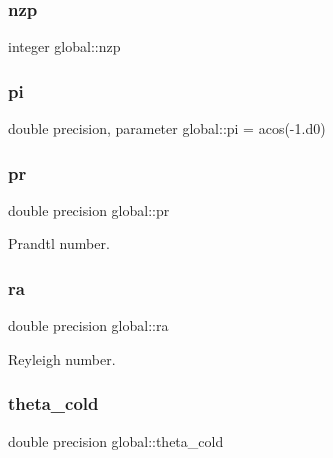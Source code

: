 \subsubsection{\texorpdfstring{nzp}{nzp}}
{\footnotesize\ttfamily integer global\+::nzp}

\mbox{\label{namespaceglobal_a2eeeef6cb4401e0205ced808c718dead}} 
\subsubsection{\texorpdfstring{pi}{pi}}
{\footnotesize\ttfamily double precision, parameter global\+::pi = acos(-\/1.d0)}

\mbox{\label{namespaceglobal_a31749f11f262d021576cd0d09bdc79c2}} 
\subsubsection{\texorpdfstring{pr}{pr}}
{\footnotesize\ttfamily double precision global\+::pr}



Prandtl number. 

\mbox{\label{namespaceglobal_a7b363950bb58d4e52dda12a928b2b9e2}} 
\subsubsection{\texorpdfstring{ra}{ra}}
{\footnotesize\ttfamily double precision global\+::ra}



Reyleigh number. 

\mbox{\label{namespaceglobal_a367640054e0083add94204f1a61bd61a}} 
\subsubsection{\texorpdfstring{theta\+\_\+cold}{theta\_cold}}
{\footnotesize\ttfamily double precision global\+::theta\+\_\+cold}



